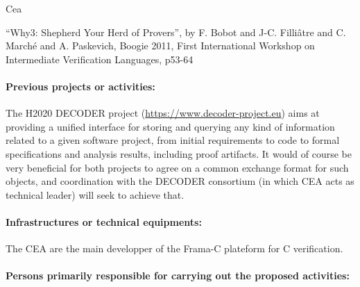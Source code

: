 \begin{sitedescription}{Cea}

\begin{compactitem}
\item ``Why3: Shepherd Your Herd of Provers'', by F. Bobot and J-C. Filli\^atre and
C. March\'e and A. Paskevich, Boogie 2011, First International Workshop on
Intermediate Verification Languages, p53-64
\end{compactitem}


\paragraph*{Previous projects or activities:}


\begin{compactitem}
\item The H2020 DECODER project (\url{https://www.decoder-project.eu}) aims at
providing a unified interface for storing and querying any kind of
information related to a given software project, from initial
requirements to code to formal specifications and analysis results,
including proof artifacts. It would of course be very beneficial for
both projects to agree on a common exchange format for such objects, and
coordination with the DECODER consortium (in which CEA acts as technical
leader) will seek to achieve that.
\end{compactitem}


\paragraph*{Infrastructures or technical equipments:}


The CEA are the main developper of the Frama-C plateform for C verification.

\paragraph*{Persons primarily responsible for carrying out the proposed activities:}

\begin{compactitem} %



\end{compactitem}
\end{sitedescription}
